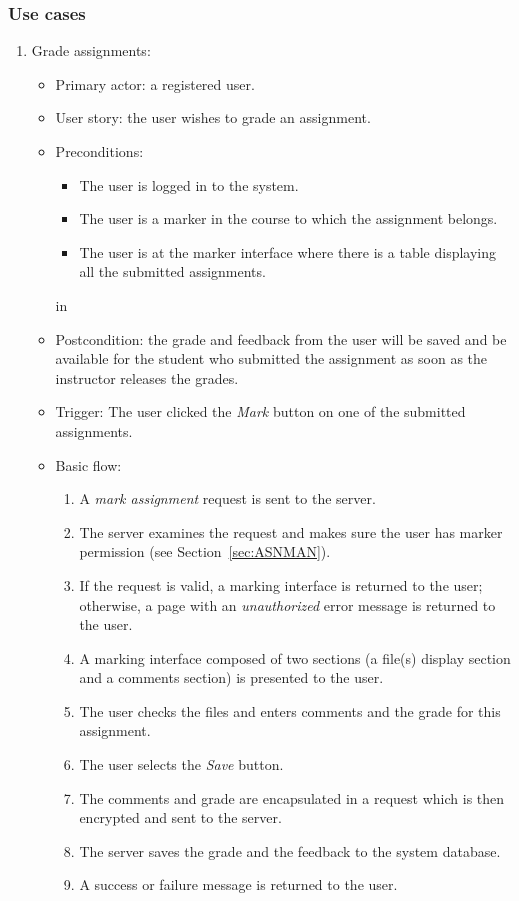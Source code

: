 \subsubsection{Use cases}
\begin{enumerate}
\item Grade assignments:
\begin{itemize}
    \item Primary actor: a registered user.
    \item User story: the user wishes to grade an assignment.
    \item Preconditions:
        \begin{itemize}
            \item The user is logged in to the system.
            \item The user is a marker in the course
                to which the assignment belongs.
            \item The user is at the marker interface where there
                is a table displaying all the submitted assignments.
        \end{itemize}
     in
    \item Postcondition:
            the grade and feedback from the user will be saved and be
            available for the student who submitted the assignment as soon
            as the instructor releases the grades.
    \item Trigger:
        The user clicked the \emph{Mark} button on one of the submitted
        assignments.
    \item Basic flow:
        \begin{enumerate}
            \item A \emph{mark assignment} request is sent to the server.
            \item The server examines the request and makes sure the user has
                marker permission (see Section~\ref{sec:ASNMAN}).
            \item If the request is valid, a marking interface is returned to
                the user; otherwise, a page with an \emph{unauthorized} error
                message is returned to the user.
            \item A marking interface composed of two sections
                (a file(s) display section and a comments section)
                is presented to the user.
            \item The user checks the files and enters comments and the
                grade for this assignment.
            \item The user selects the \emph{Save} button.
            \item The comments and grade are encapsulated in a request which
                is then encrypted and sent to the server.
            \item The server saves the grade and the feedback to the system
                database.
            \item A success or failure message is returned to the user.
        \end{enumerate}
\end{itemize}
\end{enumerate}

